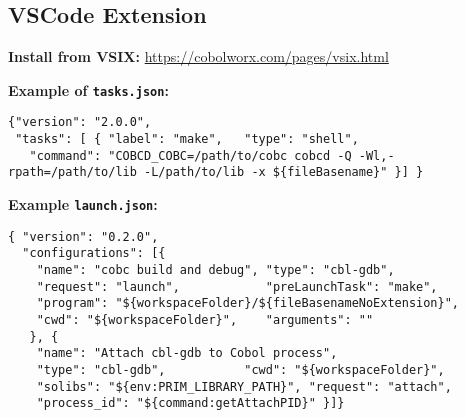 \documentclass[10pt,landscape]{article}
\begin{document}
\begin{multicols}{3}
  \subsection{VSCode Extension}

{\bf Install from VSIX:}
\url{https://cobolworx.com/pages/vsix.html}

{\bf Example of \verb+tasks.json+:}\vspace{-3mm}
\begin{verbatim}
{"version": "2.0.0",
 "tasks": [ { "label": "make",   "type": "shell",
   "command": "COBCD_COBC=/path/to/cobc cobcd -Q -Wl,-rpath=/path/to/lib -L/path/to/lib -x ${fileBasename}" }] }
\end{verbatim}\vspace{-2mm}
{\bf Example \verb+launch.json+:}\vspace{-3mm}
\begin{verbatim}
{ "version": "0.2.0",
  "configurations": [{
    "name": "cobc build and debug", "type": "cbl-gdb",
    "request": "launch",            "preLaunchTask": "make",
    "program": "${workspaceFolder}/${fileBasenameNoExtension}",
    "cwd": "${workspaceFolder}",    "arguments": ""
   }, {
    "name": "Attach cbl-gdb to Cobol process",
    "type": "cbl-gdb",           "cwd": "${workspaceFolder}",
    "solibs": "${env:PRIM_LIBRARY_PATH}", "request": "attach",
    "process_id": "${command:getAttachPID}" }]}
\end{verbatim}

\end{multicols}
\end{document}
